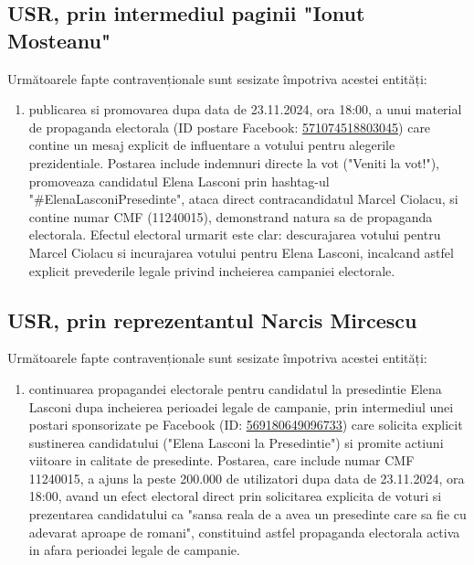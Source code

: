 \documentclass[a4paper,12pt]{article}
\begin{document}
\vspace{0.5cm}

\subsection{USR, prin intermediul paginii "Ionut Mosteanu"}
Următoarele fapte contravenționale sunt sesizate împotriva acestei entități:

\begin{enumerate}[leftmargin=*, label=\arabic*.)]
    \item publicarea si promovarea dupa data de 23.11.2024, ora 18:00, a unui material de propaganda electorala (ID postare Facebook: \href{https://www.facebook.com/ads/library/?id=571074518803045}{571074518803045}) care contine un mesaj explicit de influentare a votului pentru alegerile prezidentiale. Postarea include indemnuri directe la vot ("Veniti la vot!"), promoveaza candidatul Elena Lasconi prin hashtag-ul "\#ElenaLasconiPresedinte", ataca direct contracandidatul Marcel Ciolacu, si contine numar CMF (11240015), demonstrand natura sa de propaganda electorala. Efectul electoral urmarit este clar: descurajarea votului pentru Marcel Ciolacu si incurajarea votului pentru Elena Lasconi, incalcand astfel explicit prevederile legale privind incheierea campaniei electorale.
\end{enumerate}

\vspace{0.5cm}

\subsection{USR, prin reprezentantul Narcis Mircescu}
Următoarele fapte contravenționale sunt sesizate împotriva acestei entități:

\begin{enumerate}[leftmargin=*, label=\arabic*.)]
    \item continuarea propagandei electorale pentru candidatul la presedintie Elena Lasconi dupa incheierea perioadei legale de campanie, prin intermediul unei postari sponsorizate pe Facebook (ID: \href{https://www.facebook.com/ads/library/?id=569180649096733}{569180649096733}) care solicita explicit sustinerea candidatului ("Elena Lasconi la Presedintie") si promite actiuni viitoare in calitate de presedinte. Postarea, care include numar CMF 11240015, a ajuns la peste 200.000 de utilizatori dupa data de 23.11.2024, ora 18:00, avand un efect electoral direct prin solicitarea explicita de voturi si prezentarea candidatului ca "sansa reala de a avea un presedinte care sa fie cu adevarat aproape de romani", constituind astfel propaganda electorala activa in afara perioadei legale de campanie.
\end{enumerate}
\end{document}

